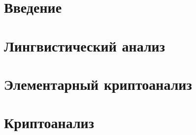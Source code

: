 \documentclass[unicode,12pt,a4paper,oneside,fleqn]{article}
\begin{document}
    
    \tableofcontents
    \pagebreak

    
    \section{Введение}
    
    \pagebreak
    
    \section{Лингвистический анализ}
    
    
    
    \pagebreak

    \section{Элементарный криптоанализ}
    
    
    
    \pagebreak

    \section{Криптоанализ}
    
    \pagebreak

    
    
\end{document}
